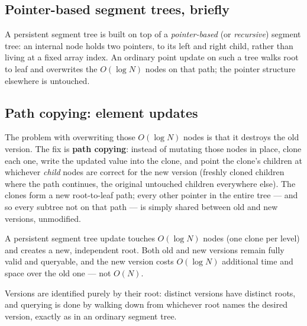 \documentclass[11pt]{article}
\begin{document}
\subsection{Pointer-based segment trees, briefly}
A persistent segment tree is built on top of a \emph{pointer-based} (or
\emph{recursive}) segment tree: an internal node holds two pointers, to
its left and right child, rather than living at a fixed array index. An
ordinary point update on such a tree walks root to leaf and overwrites the
$O(\log N)$ nodes on that path; the pointer structure elsewhere is
untouched.

\subsection{Path copying: element updates}
The problem with overwriting those $O(\log N)$ nodes is that it destroys
the old version. The fix is \textbf{path copying}: instead of mutating
those nodes in place, clone each one, write the updated value into the
clone, and point the clone's children at whichever \emph{child} nodes are
correct for the new version (freshly cloned children where the path
continues, the original untouched children everywhere else). The clones
form a new root-to-leaf path; every other pointer in the entire tree
--- and so every subtree not on that path --- is simply shared between
old and new versions, unmodified.

\begin{theorembox}
A persistent segment tree update touches $O(\log N)$ nodes (one clone per
level) and creates a new, independent root. Both old and new versions
remain fully valid and queryable, and the new version costs
$O(\log N)$ additional time and space over the old one --- not $O(N)$.
\end{theorembox}

Versions are identified purely by their root: distinct versions have
distinct roots, and querying is done by walking down from whichever root
names the desired version, exactly as in an ordinary segment tree.
\end{document}
